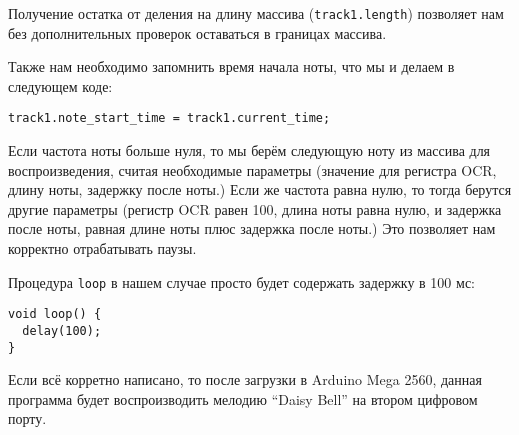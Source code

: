 \documentclass[../sparc.tex]{subfiles}
\begin{document}
Получение остатка от деления на длину массива (\texttt{track1.length})
позволяет нам без дополнительных проверок оставаться в границах массива.

Также нам необходимо запомнить время начала ноты, что мы и делаем в следующем
коде:

\begin{verbatim}
track1.note_start_time = track1.current_time;
\end{verbatim}

Если частота ноты больше нуля, то мы берём следующую ноту из массива для
воспроизведения, считая необходимые параметры (значение для регистра OCR, длину
ноты, задержку после ноты.)  Если же частота равна нулю, то тогда берутся другие
параметры (регистр OCR равен 100, длина ноты равна нулю, и задержка после ноты,
равная длине ноты плюс задержка после ноты.)  Это позволяет нам корректно
отрабатывать паузы.

Процедура \texttt{loop} в нашем случае просто будет содержать задержку
в 100 мс:

\begin{verbatim}
void loop() {
  delay(100);
}
\end{verbatim}

Если всё корретно написано, то после загрузки в Arduino Mega 2560, данная
программа будет воспроизводить мелодию ``Daisy Bell'' на втором цифровом порту.
\end{document}
